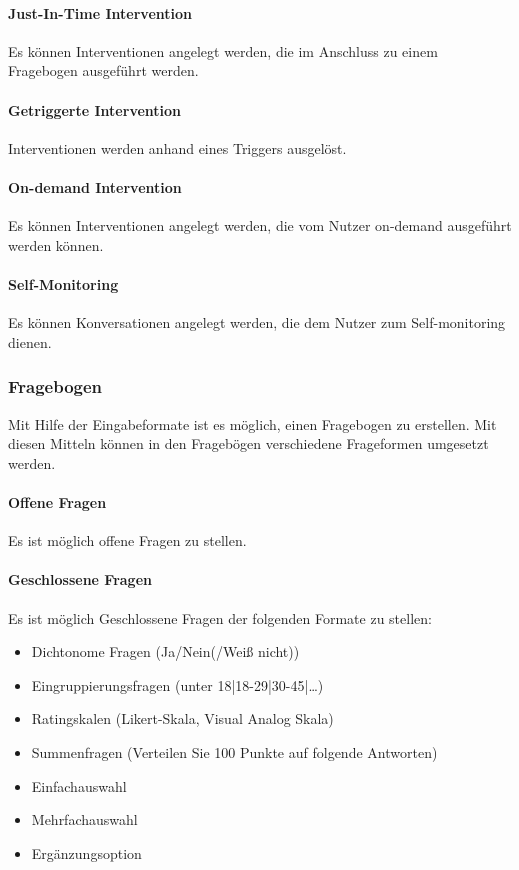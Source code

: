 \paragraph{Just-In-Time Intervention} Es können Interventionen angelegt werden, die im Anschluss zu einem Fragebogen ausgeführt werden.

\paragraph{Getriggerte Intervention} Interventionen werden anhand eines Triggers  ausgelöst.

\paragraph{On-demand Intervention} Es können Interventionen angelegt werden, die vom Nutzer on-demand ausgeführt werden können.

\paragraph{Self-Monitoring} Es können Konversationen angelegt werden, die dem Nutzer zum Self-monitoring dienen.

\subsubsection{Fragebogen}
Mit Hilfe der Eingabeformate ist es möglich, einen Fragebogen zu erstellen. Mit diesen Mitteln können in den Fragebögen verschiedene Frageformen umgesetzt werden.

\paragraph{Offene Fragen} Es ist möglich offene Fragen zu stellen.

\paragraph{Geschlossene Fragen} Es ist möglich Geschlossene Fragen der folgenden Formate zu stellen:

\begin{itemize}
\item Dichtonome Fragen (Ja/Nein(/Weiß nicht))
\item Eingruppierungsfragen (unter 18|18-29|30-45|…)
\item Ratingskalen (Likert-Skala, Visual Analog Skala)
\item Summenfragen (Verteilen Sie 100 Punkte auf folgende Antworten)
\item Einfachauswahl
\item Mehrfachauswahl
\item Ergänzungsoption
\end{itemize}


